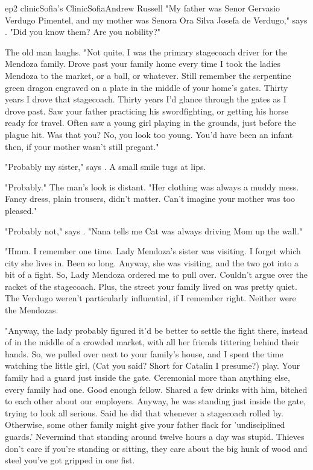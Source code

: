 \documentclass{book}
\begin{document}
\begin{node}{ep2 clinic}{Sofia's Clinic}{Sofia}{Andrew Russell}
    "My father was Senor Gervasio Verdugo Pimentel, and my mother was Senora Ora Silva Josefa de Verdugo," says \name{}. "Did you know them? Are you nobility?"

    The old man laughs. "Not quite. I was the primary stagecoach driver for the Mendoza family. Drove past your family home every time I took the ladies Mendoza to the market, or a ball, or whatever. Still remember the serpentine green dragon
    engraved on a plate in the middle of your home's gates. Thirty years I drove that stagecoach. Thirty years I'd glance through the gates as I drove past. Saw your father practicing his swordfighting, or getting his horse ready for travel. Often saw a 
    young girl playing in the grounds, just before the plague hit. Was that you? No, you look too young. You'd have been an infant then, if your mother wasn't still pregant."

    "Probably my sister," says \name{}. A small smile tugs at \hisher{} lips.

    "Probably." The man's look is distant. "Her clothing was always a muddy mess. Fancy dress, plain trousers, didn't matter. Can't imagine your mother was too pleased."

    "Probably not," says \name{}. "Nana tells me Cat was always driving Mom up the wall."

    "Hmm. I remember one time. Lady Mendoza's sister was visiting. I forget which city she lives in. Been so long. Anyway, she was visiting, and the two got into a bit of a fight. So, Lady Mendoza ordered me to pull over. Couldn't argue over the racket of the
    stagecoach. Plus,
    the street your family lived on was pretty quiet. The Verdugo weren't particularly influential, if I remember right. Neither were the Mendozas. 
    
    "Anyway, the lady probably figured it'd be better to settle the fight there, instead of in the middle of a crowded
    market, with all her friends tittering behind their hands. So, we pulled over next to your family's house, and I spent the time watching the little girl, (Cat you said? Short for Catalin I presume?) play. Your family had a guard just inside the gate. Ceremonial 
    more
    than anything else, every family had one. Good enough fellow. Shared a few drinks with him, bitched to each other about our employers. Anyway, he was standing just inside the gate, trying to look all serious. Said he did that whenever a stagecoach rolled by. 
    Otherwise, some other family might give your father flack for 'undisciplined guards.' Nevermind that standing around twelve hours a day was stupid. Thieves don't care if you're standing or sitting, they care about the big hunk of wood and steel you've got 
    gripped in one fist.
    

\end{node}
\end{document}
